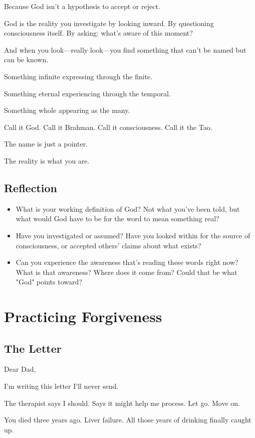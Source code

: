 \documentclass[11pt,twoside]{book}
\begin{document}
Because God isn't a hypothesis to accept or reject.

God is the reality you investigate by looking inward. By questioning consciousness itself. By asking: what's aware of this moment?

And when you look—really look—you find something that can't be named but can be known.

Something infinite expressing through the finite.

Something eternal experiencing through the temporal.

Something whole appearing as the many.

Call it God. Call it Brahman. Call it consciousness. Call it the Tao.

The name is just a pointer.

The reality is what you are.

\section*{Reflection}

\begin{itemize}
\item What is your working definition of God? Not what you've been told, but what would God have to be for the word to mean something real?
\item Have you investigated or assumed? Have you looked within for the source of consciousness, or accepted others' claims about what exists?
\item Can you experience the awareness that's reading these words right now? What is that awareness? Where does it come from? Could that be what "God" points toward?
\end{itemize}

\chapter{Practicing Forgiveness}

\section*{The Letter}

Dear Dad,

I'm writing this letter I'll never send.

The therapist says I should. Says it might help me process. Let go. Move on.

You died three years ago. Liver failure. All those years of drinking finally caught up.
\end{document}
